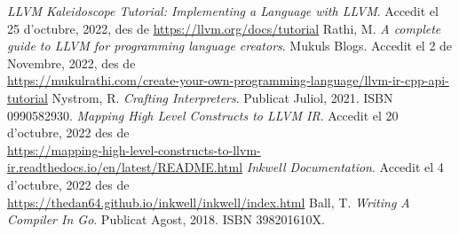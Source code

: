 ﻿\documentclass{article}
\begin{document}
\newpage
\renewcommand\refname{Bibliografia}
\begin{thebibliography}{9}

 \textit{LLVM Kaleidoscope Tutorial: Implementing a Language with LLVM}. Accedit el 25 d'octubre, 2022, des de \url{https://llvm.org/docs/tutorial}
 Rathi, M. \textit{A complete guide to LLVM for programming language creators}. Mukuls Blogs. Accedit el 2 de Novembre, 2022, des de \\\url{https://mukulrathi.com/create-your-own-programming-language/llvm-ir-cpp-api-tutorial}
 Nystrom, R. \textit{Crafting Interpreters}. Publicat Juliol, 2021. ISBN 0990582930.
 \textit{Mapping High Level Constructs to LLVM IR}. Accedit el 20 d'octubre, 2022 des de \\\url{https://mapping-high-level-constructs-to-llvm-ir.readthedocs.io/en/latest/README.html}
 \textit{Inkwell Documentation}. Accedit el 4 d'octubre, 2022 des de \\\url{https://thedan64.github.io/inkwell/inkwell/index.html}
 Ball, T. \textit{Writing A Compiler In Go}. Publicat Agost, 2018. ISBN 398201610X.

\end{thebibliography}
\end{document}
